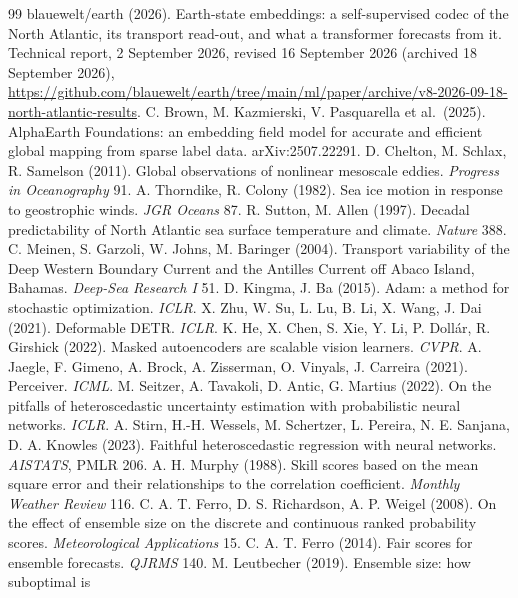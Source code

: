 \documentclass[10pt]{article}
\begin{document}
\begin{thebibliography}{99}\small
{} blauewelt/earth (2026). Earth-state embeddings: a
self-supervised codec of the North Atlantic, its transport read-out, and
what a transformer forecasts from it. Technical report, 2 September 2026,
revised 16 September 2026 (archived 18 September 2026),
\url{https://github.com/blauewelt/earth/tree/main/ml/paper/archive/v8-2026-09-18-north-atlantic-results}.
 C. Brown, M. Kazmierski, V. Pasquarella et al.\ (2025).
AlphaEarth Foundations: an embedding field model for accurate and efficient
global mapping from sparse label data. arXiv:2507.22291.
 D. Chelton, M. Schlax, R. Samelson (2011). Global
observations of nonlinear mesoscale eddies. \emph{Progress in Oceanography}
91.
 A. Thorndike, R. Colony (1982). Sea ice motion in
response to geostrophic winds. \emph{JGR Oceans} 87.
 R. Sutton, M. Allen (1997). Decadal predictability of North
Atlantic sea surface temperature and climate. \emph{Nature} 388.
 C. Meinen, S. Garzoli, W. Johns, M. Baringer (2004).
Transport variability of the Deep Western Boundary Current and the Antilles
Current off Abaco Island, Bahamas. \emph{Deep-Sea Research I} 51.
 D. Kingma, J. Ba (2015). Adam: a method for stochastic
optimization. \emph{ICLR}.
 X. Zhu, W. Su, L. Lu, B. Li, X. Wang, J. Dai (2021).
Deformable DETR. \emph{ICLR}.
 K. He, X. Chen, S. Xie, Y. Li, P. Doll\'ar, R. Girshick
(2022). Masked autoencoders are scalable vision learners. \emph{CVPR}.
 A. Jaegle, F. Gimeno, A. Brock, A. Zisserman, O.
Vinyals, J. Carreira (2021). Perceiver. \emph{ICML}.
 M. Seitzer, A. Tavakoli, D. Antic, G. Martius (2022). On
the pitfalls of heteroscedastic uncertainty estimation with probabilistic
neural networks. \emph{ICLR}.
 A. Stirn, H.-H. Wessels, M. Schertzer, L. Pereira, N. E.
Sanjana, D. A. Knowles (2023). Faithful heteroscedastic regression with
neural networks. \emph{AISTATS}, PMLR 206.
 A. H. Murphy (1988). Skill scores based on the mean square
error and their relationships to the correlation coefficient. \emph{Monthly
Weather Review} 116.
 C. A. T. Ferro, D. S. Richardson, A. P. Weigel (2008).
On the effect of ensemble size on the discrete and continuous ranked
probability scores. \emph{Meteorological Applications} 15.
 C. A. T. Ferro (2014). Fair scores for ensemble
forecasts. \emph{QJRMS} 140.
 M. Leutbecher (2019). Ensemble size: how suboptimal is

\end{thebibliography}
\end{document}
